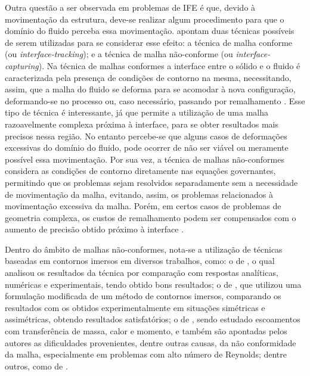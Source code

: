 Outra questão a ser observada em problemas de IFE é que, devido à movimentação da estrutura, deve-se realizar algum procedimento para que o domínio do fluido perceba essa movimentação.  apontam duas técnicas possíveis de serem utilizadas para se considerar esse efeito: a técnica de malha conforme (ou \textit{interface-tracking}); e a técnica de malha não-conforme (ou \textit{interface-capturing}). Na técnica de malhas conformes a interface entre o sólido e o fluido é caracterizada pela presença de condições de contorno na mesma, necessitando, assim, que a malha do fluido se deforma para se acomodar à nova configuração, deformando-se no processo ou, caso necessário, passando por remalhamento \cite{terahara2020heart}. Esse tipo de técnica é interessante, já que permite a utilização de uma malha razoavelmente complexa próxima à interface, para se obter resultados mais precisos nessa região. No entanto percebe-se que alguns casos de deformações excessivas do domínio do fluido, pode ocorrer de não ser viável ou meramente possível essa movimentação. Por sua vez, a técnica de malhas não-conformes considera as condições de contorno diretamente nas equações governantes, permitindo que os problemas sejam resolvidos separadamente sem a necessidade de movimentação da malha, evitando, assim, os problemas relacionados à movimentação excessiva da malha. Porém, em certos casos de problemas de geometria complexa, os custos de remalhamento podem ser compensados com o aumento de precisão obtido próximo à interface \cite{bazilevs2013computational,hou2012numerical,bazilevs2015ale}.

Dentro do âmbito de malhas não-conformes, nota-se a utilização de técnicas baseadas em contornos imersos em diversos trabalhos, como: o de , o qual analisou os resultados da técnica por comparação com respostas analíticas, numéricas e experimentais, tendo obtido bons resultados; o de , que utilizou uma formulação modificada de um método de contornos imersos, comparando os resultados com os obtidos experimentalmente em situações simétricas e assimétricas, obtendo resultados satisfatórios; o de , sendo estudado escoamentos com transferência de massa, calor e momento, e também são apontadas pelos autores as dificuldades provenientes, dentre outras causas, da não conformidade da malha, especialmente em problemas com alto número de Reynolds; dentre outros, como de .

